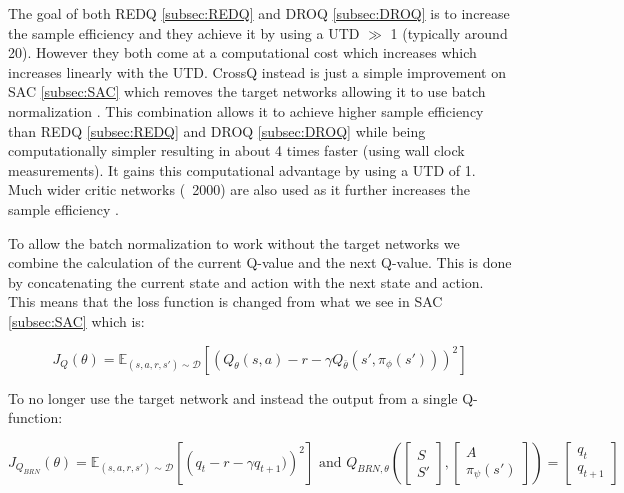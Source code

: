 The goal of both REDQ \ref{subsec:REDQ} and DROQ \ref{subsec:DROQ} is to increase the sample efficiency and they achieve it by using a UTD $\gg$ 1 (typically around 20). However they both come at a computational cost which increases which increases linearly with the UTD. CrossQ \cite{bhattCrossQBatchNormalization2024} instead is just a simple improvement on SAC \ref{subsec:SAC} which removes the target networks allowing it to use batch normalization \cite{ioffeBatchRenormalizationReducing2017}. This combination allows it to achieve higher sample efficiency than REDQ \ref{subsec:REDQ} and DROQ \ref{subsec:DROQ} while being computationally simpler resulting in about 4 times faster (using wall clock measurements). It gains this computational advantage by using a UTD of 1. Much wider critic networks (~2000) are also used as it further increases the sample efficiency \cite{bhattCrossQBatchNormalization2024}.

To allow the batch normalization to work without the target networks we combine the calculation of the current Q-value and the next Q-value. This is done by concatenating the current state and action with the next state and action. This means that the loss function is changed from what we see in SAC \ref{subsec:SAC} which is:

\begin{equation}
    J_Q(\theta) = \mathbb{E}_{(s,a,r,s') \sim \mathcal{D}} \left[ \left( Q_{\theta}(s,a) - r - \gamma Q_{\bar{\theta}}(s',\pi_{\phi}(s')) \right)^2 \right]
\end{equation}

To no longer use the target network and instead the output from a single Q-function:

\begin{equation}
    J_{Q_{BRN}}(\theta) = \mathbb{E}_{(s,a,r,s') \sim \mathcal{D}} \left[ \left( q_t - r - \gamma q_{t+1}) \right)^2 \right] \text{ and } Q_{BRN,\theta}( \left[ \begin{matrix} S \\ S' \end{matrix}\right], \left[ \begin{matrix} A \\ \pi_\psi(s') \end{matrix}\right]) = \left[ \begin{matrix} q_t \\ q_{t+1} \end{matrix}\right]
\end{equation}

